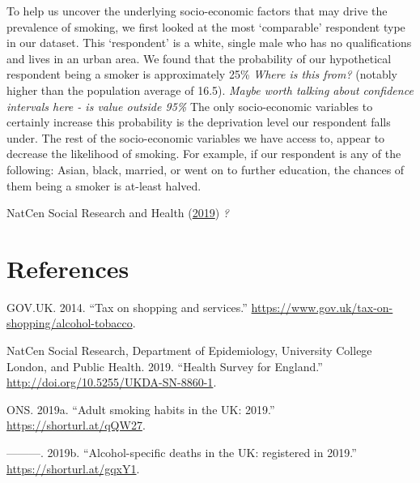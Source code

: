 \documentclass[
  11pt,
  twocolumn]{article}
\newlength{\cslhangindent}
\newlength{\cslentryspacingunit} %
\newenvironment{CSLReferences}[2] %
 {%
  \setlength{\parindent}{0pt}
  \ifodd #1
  \let\oldpar\par
  \def\par{\hangindent=\cslhangindent\oldpar}
  \fi
  \setlength{\parskip}{#2\cslentryspacingunit}
 }%
 {}
\begin{document}
To help us uncover the underlying socio-economic factors that may drive
the prevalence of smoking, we first looked at the most `comparable'
respondent type in our dataset. This `respondent' is a white, single
male who has no qualifications and lives in an urban area. We found that
the probability of our hypothetical respondent being a smoker is
approximately 25\% \emph{Where is this from?} (notably higher than the
population average of 16.5). \emph{Maybe worth talking about confidence
intervals here - is value outside 95\%} The only socio-economic
variables to certainly increase this probability is the deprivation
level our respondent falls under. The rest of the socio-economic
variables we have access to, appear to decrease the likelihood of
smoking. For example, if our respondent is any of the following: Asian,
black, married, or went on to further education, the chances of them
being a smoker is at-least halved.

NatCen Social Research and Health (\protect\hyperlink{ref-Main}{2019})
\emph{?}

\clearpage

\hypertarget{references}{%
\section*{References}\label{references}}

\hypertarget{refs}{}
\begin{CSLReferences}{1}{0}
\leavevmode{}%
GOV.UK. 2014. {``{Tax on shopping and services}.''}
\url{https://www.gov.uk/tax-on-shopping/alcohol-tobacco}.

\leavevmode{}%
NatCen Social Research, Department of Epidemiology, University College
London, and Public Health. 2019. {``{Health Survey for England}.''}
\url{http://doi.org/10.5255/UKDA-SN-8860-1}.

\leavevmode{}%
ONS. 2019a. {``{Adult smoking habits in the UK: 2019}.''}
\url{https://shorturl.at/qQW27}.

\leavevmode{}%
---------. 2019b. {``{Alcohol-specific deaths in the UK: registered in
2019}.''} \url{https://shorturl.at/gqxY1}.

\end{CSLReferences}
\end{document}
